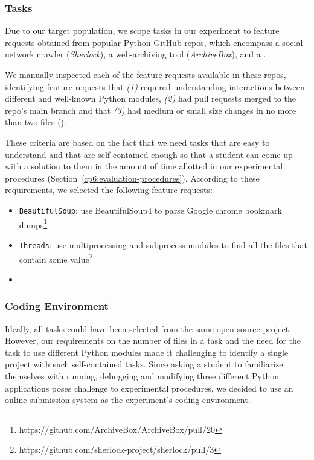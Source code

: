 \subsubsection{Tasks}

Due to our target population, we scope tasks in our experiment to  
feature requests obtained from popular Python GitHub repos,
which encompass a social network crawler (\textit{Sherlock}),
a web-archiving tool (\textit{ArchiveBox}), and a .



We manually inspected each of the feature requests available in these repos, identifying
feature requests that
\textit{(1)}  required understanding interactions between different and well-known Python modules, 
\textit{(2)}  had pull requests merged to the repo's main branch and that
\textit{(3)}  had medium or small size changes in no more than two files ().


These criteria are based on the fact that we need tasks that are easy to understand and that are self-contained enough so that a student can come up with a solution to them in the amount of time allotted in our experimental procedures (Section~\ref{cp6:evaluation-procedures}).
According to these requirements, we selected the following feature requests:


\begin{itemize}
    \item \texttt{BeautifulSoup}: use BeautifulSoup4 to parse Google chrome bookmark dumps\footnote{https://github.com/ArchiveBox/ArchiveBox/pull/20}
    \item  \texttt{Threads}: use multiprocessing and subprocess modules to find all the files that contain some value\footnote{https://github.com/sherlock-project/sherlock/pull/3}
    \item {}
\end{itemize}



\subsubsection{Coding Environment}


Ideally, all tasks could have been selected from the same open-source project. However, our requirements on the number of files in a task and the need for the task to use different Python modules made it challenging to identify a single project with such self-contained tasks. Since asking a student to familiarize themselves with running, debugging and modifying three different Python applications 
poses challenge to experimental procedures, we decided to use 
an online submission system as the experiment's coding environment.



